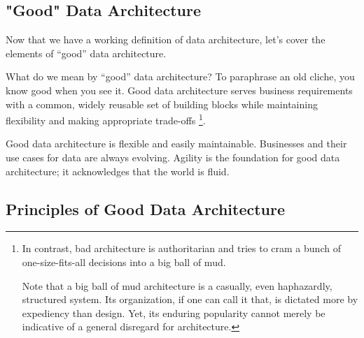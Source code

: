 \subsection*{"Good" Data Architecture}
Now that we have a working definition of data architecture, let's
cover the elements of “good” data architecture.

What do we mean by “good” data architecture?
To paraphrase an old cliche, you know good when you see it.
Good data architecture serves business requirements with a common,
widely reusable set of building blocks while maintaining flexibility
and making appropriate trade-offs
\footnote{
    In contrast, bad architecture is authoritarian and tries to cram
    a bunch of one-size-fits-all decisions into a big ball of mud.

    Note that a big ball of mud architecture is a casually, even
    haphazardly, structured system. Its organization, if one can
    call it that, is dictated more by expediency than design.
    Yet, its enduring popularity cannot merely be indicative of a
    general disregard for architecture. 
}.

Good data architecture is flexible and easily maintainable. Businesses
and their use cases for data are always evolving. Agility is the
foundation for good data architecture; it acknowledges that the world
is fluid.




\subsection{Principles of Good Data Architecture}

